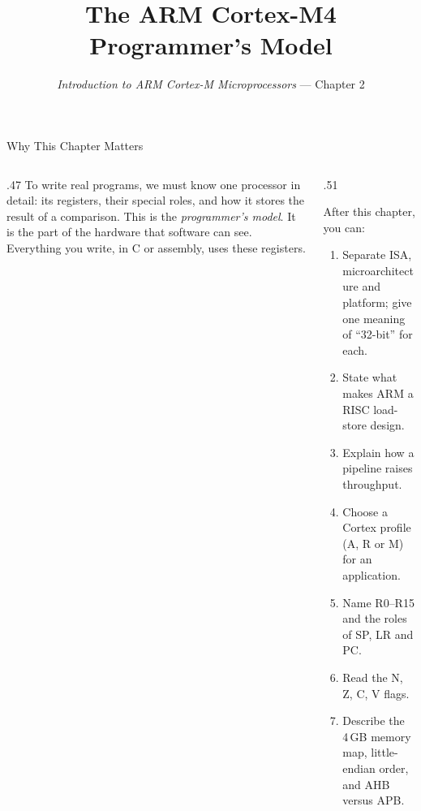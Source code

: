 \documentclass[9pt,aspectratio=169,xcolor=table]{beamer}
\title{The ARM Cortex-M4 Programmer's Model}
\subtitle{\emph{Introduction to ARM Cortex-M Microprocessors} --- Chapter 2}
\begin{document}
\titlepage
\begin{frame}{Why This Chapter Matters}
    \begin{columns}[T]
    \begin{column}{.47\textwidth}
        {\normalsize To write real programs, we must know one processor in detail: its registers, their special roles, and how it stores the result of a comparison. This is the \emph{programmer's model}. It is the part of the hardware that software can see. Everything you write, in C or assembly, uses these registers.}
    \end{column}
    \begin{column}{.51\textwidth}
        \begin{block}{After this chapter, you can:}
        {\small
        \begin{enumerate}\itemsep2pt
            \item Separate ISA, microarchitecture and platform; give one meaning of ``32-bit'' for each.
            \item State what makes ARM a RISC load-store design.
            \item Explain how a pipeline raises throughput.
            \item Choose a Cortex profile (A, R or M) for an application.
            \item Name R0--R15 and the roles of SP, LR and PC.
            \item Read the N, Z, C, V flags.
            \item Describe the 4\,GB memory map, little-endian order, and AHB versus APB.
        \end{enumerate}}
        \end{block}
    \end{column}
    \end{columns}
\end{frame}
\end{document}
